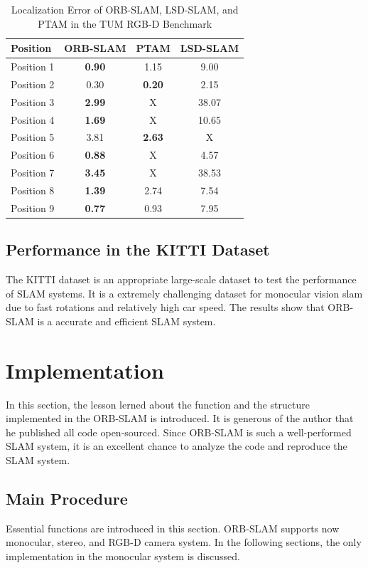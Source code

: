 \documentclass[letterpaper, 10 pt, conference]{ieeeconf}  %
\begin{document}
\begin{table}[h!]
\caption{Localization Error of ORB-SLAM, LSD-SLAM, and PTAM in the  TUM RGB-D Benchmark}
\label{TUM Dataset}
\centering
\begin{tabular}{ l c c c } 
\hline
 \hline
 Position & ORB-SLAM & PTAM & LSD-SLAM\\ 
 \hline
 Position 1	& \textbf{0.90} & 1.15 & 9.00\\ 
 Position 2	& 0.30 & \textbf{0.20} & 2.15\\ 
 Position 3	& \textbf{2.99} & X & 38.07\\ 
 Position 4 & \textbf{1.69} & X & 10.65\\ 
 Position 5	& 3.81 & \textbf{2.63} & X\\ 
 Position 6 & \textbf{0.88} & X & 4.57\\ 
 Position 7 & \textbf{3.45} & X & 38.53\\
 Position 8 & \textbf{1.39} & 2.74 & 7.54\\
 Position 9 & \textbf{0.77} & 0.93 & 7.95\\
\hline
 \hline
\end{tabular}
\end{table}
%

\subsection{Performance in the KITTI Dataset}
The KITTI dataset is an appropriate large-scale dataset to test the performance of SLAM systems. It is a extremely challenging dataset for monocular vision slam due to fast rotations and relatively high car speed. The results show that ORB-SLAM is a accurate and efficient SLAM system.

\section{Implementation} 
In this section, the lesson lerned about the function and the structure implemented in the ORB-SLAM is introduced. It is generous of the author that he published all code open-sourced. Since ORB-SLAM is such a well-performed SLAM system, it is an excellent chance to analyze the code and reproduce the SLAM system. 

\subsection{Main Procedure}
Essential functions are introduced in this section. ORB-SLAM supports now monocular, stereo, and RGB-D camera system. In the following sections, the only implementation in the monocular system is discussed.
\end{document}
